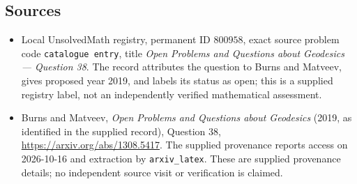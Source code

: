 \documentclass[11pt]{article}
\begin{document}
\subsection{Sources}
\begin{itemize}
\item Local UnsolvedMath registry, permanent ID \(800958\), exact source problem code \texttt{catalogue entry}, title \emph{Open Problems and Questions about Geodesics --- Question 38}. The record attributes the question to Burns and Matveev, gives proposed year 2019, and labels its status as open; this is a supplied registry label, not an independently verified mathematical assessment.
\item Burns and Matveev, \emph{Open Problems and Questions about Geodesics} (2019, as identified in the supplied record), Question 38, \url{https://arxiv.org/abs/1308.5417}. The supplied provenance reports access on 2026-10-16 and extraction by \texttt{arxiv\_latex}. These are supplied provenance details; no independent source visit or verification is claimed.
\end{itemize}
\end{document}
